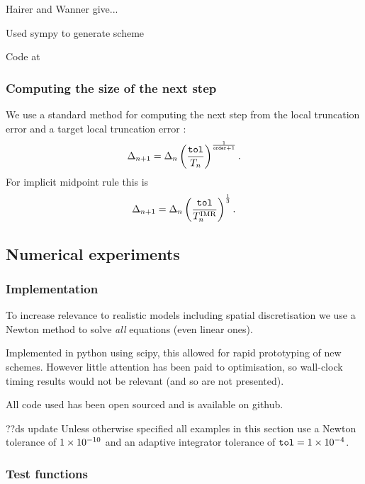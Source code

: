 Hairer and Wanner\cite{Hairer book} give...

Used sympy\cite{??ds sympy} to generate scheme

Code at \cite{??ds github}

\subsubsection{Computing the size of the next step}

We use a standard method for computing the next step from the local truncation error and a target local truncation error \toltt:\cite[pg.268]{Gresho-Sani}
\begin{equation}
\Delta_{n+1} = \Delta_{n} \left( \frac{{\textrm{\textup{\texttt{tol}}}}}{T_n}  \right) ^{\frac{1}{\texttt{order}+1}}.
\end{equation}
For implicit midpoint rule this is
\begin{equation}
  \Delta_{n+1} = \Delta_{n} \left( \frac{{\textrm{\textup{\texttt{tol}}}}}{T_n^{\text{IMR}}}  \right) ^{\frac{1}{3}}.
\end{equation}


\subsection{Numerical experiments}

\subsubsection{Implementation}

To increase relevance to realistic models including spatial discretisation we use a Newton method to solve \emph{all} equations (even linear ones).

Implemented in python using scipy, this allowed for rapid prototyping of new schemes. However little attention has been paid to optimisation, so wall-clock timing results would not be relevant (and so are not presented).

All code used has been open sourced and is available on github.\cite{simple-ode-github}


??ds update
Unless otherwise specified all examples in this section use a Newton tolerance of $1\times 10^{-10}$ and an adaptive integrator tolerance of ${\textrm{\textup{\texttt{tol}}}} = 1\times 10^{-4}$.


\subsubsection{Test functions}

